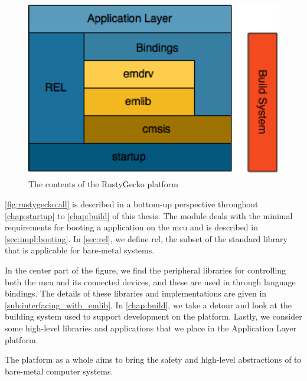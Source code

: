 \begin{figure}[H]
  \begin{center}
    \includegraphics[scale=0.2]{figures/RustyGecko-all.png}
  \end{center}
  \caption{The contents of the RustyGecko platform}
  \label{fig:rustygecko:all}
\end{figure}

\autoref{fig:rustygecko:all} is described in a bottom-up perspective throughout \autoref{chap:startup} to \autoref{chap:build} of this thesis.
The  module deals with the minimal requirements for booting a {\rust} application on the \gls{mcu} and is described in \autoref{sec:impl:booting}.
In \autoref{sec:rel}, we define \gls{rel}, the subset of the {\rust} standard library that is applicable for bare-metal systems.

In the center part of the figure, we find the peripheral libraries for controlling both the \gls{mcu} and its connected devices, and these are used in {\rust} through language bindings.
The details of these libraries and implementations are given in \autoref{sub:interfacing_with_emlib}.
In \autoref{chap:build}, we take a detour and look at the building system used to support development on the {\rg} platform.
Lastly, we consider some high-level libraries and applications that we place in the Application Layer platform.

The {\rg} platform as a whole aims to bring the safety and high-level abstractions of {\rust} to bare-metal computer systems.
